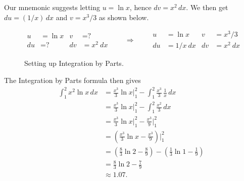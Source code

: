 {%
Our mnemonic suggests letting $u=\ln x$, hence $dv =x^2\,dx$. 
We then get $du = (1/x)\,dx$ and $v=x^3/3$ as shown below.

\begin{figure}[!hb]
\[
\begin{aligned}
u&= \ln x & v&=\text{?}\\
du&= \text{?} & dv&=x^2\ dx
\end{aligned}
\qquad\Rightarrow\qquad
\begin{aligned}
u&= \ln x& v&=x^3/3\\
du&= 1/x\ dx & dv&=x^2\ dx
\end{aligned}
\]
\captionsetup{type=figure}%
\caption{Setting up Integration by Parts.}\label{fig:ibp7}
\end{figure}%

The Integration by Parts formula then gives
\begin{align*}
	\int_1^2 x^2 \ln x\,dx
	&= \frac{x^3}3\ln x\bigg|_1^2 - \int_1^2 \frac{x^3}{3}\,\frac 1x\,dx \\
	&=  \frac{x^3}3\ln x\bigg|_1^2 - \int_1^2 \frac{x^2}{3}\,dx \\
	&=  \frac{x^3}3\ln x\bigg|_1^2 - \frac{x^3}{9}\bigg|_1^2\\
	&=  \left(\frac{x^3}3\ln x - \frac{x^3}{9}\right)\bigg|_1^2\\
	&=	\left(\frac83\ln 2 - \frac89\right)-\left(\frac13\ln 1 - \frac19\right) \\
	&= \frac83\ln 2 - \frac79 \\
	&\approx 1.07.
\end{align*}}

